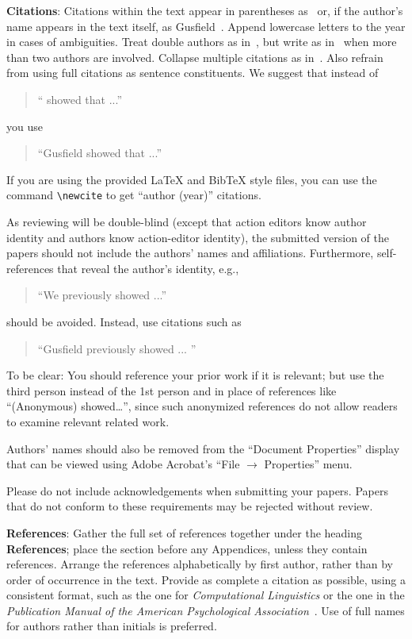 \documentclass[11pt,letterpaper]{article}
\begin{document}
{\bf Citations}: Citations within the text appear
in parentheses as~\cite{Gusfield:97} or, if the author's name appears in
the text itself, as Gusfield~. Append lowercase letters to the year in cases of ambiguities. Treat double authors as in~\cite{Aho:72}, but write as in~\cite{Chandra:81} when more than two authors are involved. Collapse multiple citations as in~\cite{Gusfield:97,Aho:72}. Also refrain from using full citations as sentence constituents. We suggest that instead of
\begin{quote}
  ``\cite{Gusfield:97} showed that ...''
\end{quote}
you use
\begin{quote}
``Gusfield    showed that ...''
\end{quote}

If you are using the provided \LaTeX{} and Bib\TeX{} style files, you
can use the command \verb|\newcite| to get ``author (year)'' citations.

As reviewing will be double-blind (except that action editors know author identity and authors know action-editor identity), the submitted version of the papers should not include the
authors' names and affiliations. Furthermore, self-references that
reveal the author's identity, e.g.,
\begin{quote}
``We previously showed \cite{Gusfield:97} ...''
\end{quote}
should be avoided. Instead, use citations such as
\begin{quote}
``Gusfield 
previously showed ... ''
\end{quote}

To be clear: You should reference your prior work if it is relevant; but use the third person instead of the 1st person and in place of references like “(Anonymous) showed…”, since such anonymized references do not allow readers to examine relevant related work.

Authors’ names should also be removed from the ``Document Properties'' display that can be viewed using Adobe Acrobat’s ``File $\rightarrow$ Properties'' menu.

Please do not include acknowledgements when submitting your papers. Papers that do not conform
to these requirements may be rejected without review.

\textbf{References}: Gather the full set of references together under
the heading {\bf References}; place the section before any Appendices,
unless they contain references. Arrange the references alphabetically
by first author, rather than by order of occurrence in the text.
Provide as complete a citation as possible, using a consistent format,
such as the one for {\em Computational Linguistics\/} or the one in the
{\em Publication Manual of the American
Psychological Association\/}~\cite{APA:83}.  Use of full names for
authors rather than initials is preferred.  
\end{document}
